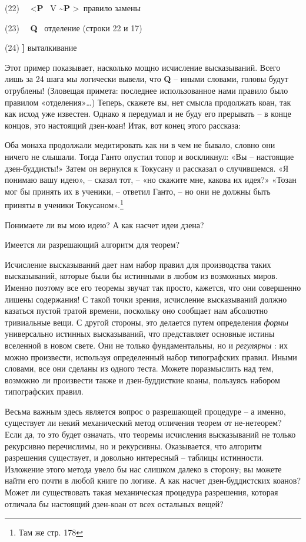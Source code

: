 \documentclass[../main.tex]{subfiles}
\begin{document}
(22)~~ \textless{}\textbf{P} ~V \textbf{\textasciitilde P} \textgreater~правило замены

(23)~~ \textbf{Q} ~отделение (строки 22 и 17)

(24) \textbf{{]}} выталкивание

Этот пример показывает, насколько мощно исчисление высказываний. Всего лишь за 24 шага мы логически вывели, что \textbf{Q} \--- иными словами, головы будут отрублены! (Зловещая примета: последнее использованное нами правило было правилом «отделения»\ldots) Теперь, скажете вы, нет смысла продолжать коан, так как исход уже известен. Однако я передумал и не буду его прерывать \--- в конце концов, это настоящий дзен-коан! Итак, вот конец этого рассказа:

Оба монаха продолжали медитировать как ни в чем не бывало, словно они ничего не слышали. Тогда Ганто опустил топор и воскликнул: «Вы \--- настоящие дзен-буддисты!» Затем он вернулся к Токусану и рассказал о случившемся. «Я понимаю вашу идею», \--- сказал тот, \--- «но скажите мне, какова их идея?» «Тозан мог бы принять их в ученики, \--- ответил Ганто, \--- но они не должны быть приняты в ученики Токусаном».\footnote{Там же стр. 178}

Понимаете ли вы мою идею? А как насчет идеи дзена?

Имеется ли разрешающий алгоритм для теорем?

Исчисление высказываний дает нам набор правил для производства таких высказываний, которые были бы истинными в любом из возможных миров. Именно поэтому все его теоремы звучат так просто, кажется, что они совершенно лишены содержания! С такой точки зрения, исчисление высказываний должно казаться пустой тратой времени, поскольку оно сообщает нам абсолютно тривиальные вещи. С другой стороны, это делается путем определения \emph{формы} универсально истинных высказываний, что представляет основные истины вселенной в новом свете. Они не только фундаментальны, но и \emph{регулярны} : их можно произвести, используя определенный набор типографских правил. Иными словами, все они сделаны из одного теста. Можете поразмыслить над тем, возможно ли произвести также и дзен-буддисткие коаны, пользуясь набором типографских правил.

Весьма важным здесь является вопрос о разрешающей процедуре \--- а именно, существует ли некий механический метод отличения теорем от не-нетеорем? Если да, то это будет означать, что теоремы исчисления высказываний не только рекурсивно перечислимы, но и рекурсивны. Оказывается, что алгоритм разрешения существует, и довольно интересный \--- таблицы истинности. Изложение этого метода увело бы нас слишком далеко в сторону; вы можете найти его почти в любой книге по логике. А как насчет дзен-буддистских коанов? Может ли существовать такая механическая процедура разрешения, которая отличала бы настоящий дзен-коан от всех остальных вещей?
\end{document}

